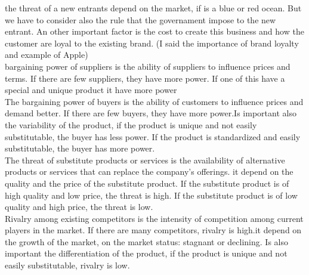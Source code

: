 \documentclass[12pt,a4paper]{report}
\begin{document}
the threat of a new entrants depend on the market, if is a blue or red ocean. But we have to consider also the rule that the governament impose to the new entrant. An other important factor is the cost to create this business and how the customer are loyal to the existing brand. (I said the importance of brand loyalty and example of Apple)
\\
bargaining power of suppliers is the ability of suppliers to influence prices and terms. If there are few suppliers, they have more power. If one of this have a special and unique product it have more power 
\\
 The bargaining power of buyers is the ability of customers to influence prices and demand better. If there are few buyers, they have more power.Is important also the variability of the product, if the product is unique and not easily substitutable, the buyer has less power. If the product is standardized and easily substitutable, the buyer has more power. 
 \\
 The threat of substitute products or services is the availability of alternative products or services that can replace the company's offerings. it depend on the quality and the price of the substitute product. If the substitute product is of high quality and low price, the threat is high. If the substitute product is of low quality and high price, the threat is low.
 \\
  Rivalry among existing competitors is the intensity of competition among current players in the market. If there are many competitors, rivalry is high.it depend on the growth of the market, on the market status: stagnant or declining. Is also important the differentiation of the product, if the product is unique and not easily substitutable, rivalry is low. 
\end{document}
